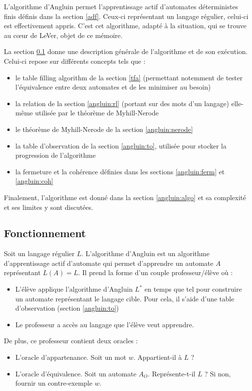L'algorithme d'Angluin permet l'apprentissage actif d'automates déterministes finis définis dans la section \ref{adf}. Ceux-ci représentant un langage régulier, celui-ci est effectivement appris. C'est cet algorithme, adapté à la situation, qui se trouve au cœur de LeVer, objet de ce mémoire.

La section \ref{angluin:fonc} donne une description générale de l'algorithme et de son exécution. Celui-ci repose sur différents concepts tels que :
\begin{itemize}
  \item le table filling algorithm de la section \ref{tfa} (permettant notemment de tester l'équivalence entre deux automates et de les minimiser au besoin)
  \item la relation \rl de la section \ref{angluin:rl} (portant sur des mots d'un langage) elle-même utilisée par le théorème de Myhill-Nerode
  \item le théorème de Myhill-Nerode de la section \ref{angluin:nerode}
  \item la table d'observation de la section \ref{angluin:to}, utilisée pour stocker la progression de l'algorithme
  \item la fermeture et la cohérence définies dans les sections \ref{angluin:ferm} et \ref{angluin:coh}
\end{itemize}

Finalement, l'algorithme est donné dans la section \ref{angluin:algo} et sa complexité et ses limites y sont discutées.

\subsection{Fonctionnement}\label{angluin:fonc}

Soit un langage régulier $L$. L'algorithme d'Angluin\cite{Angluin87} est un algorithme d'apprentissage actif d'automate qui permet d'apprendre un automate $A$ représentant $L(A)=L$. Il prend la forme d'un couple professeur/élève où :
\begin{itemize}
	\item L'élève applique l'algorithme d'Angluin $L^*$ en temps que tel pour construire un automate représentant le langage cible. Pour cela, il s'aide d'une table d'observation (section \ref{angluin:to})
	\item Le professeur a accès au langage que l'élève veut apprendre.
\end{itemize}

De plus, ce professeur contient deux oracles :
\begin{itemize}
	\item L'oracle d'appartenance. Soit un mot $w$. Appartient-il à $L$ ?
	\item L'oracle d'équivalence. Soit un automate $A_O$. Représente-t-il $L$ ? Si non, fournir un contre-exemple $w$.
\end{itemize}


